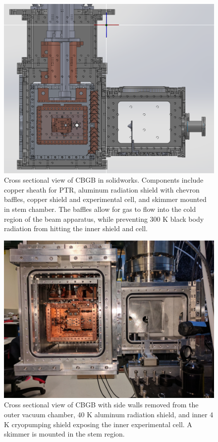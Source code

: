 \begin{figure}[H]
	\centering
	\includegraphics[width=1\textwidth]{images/CBGB_solidworks_cross_section.png}
	\caption{Cross sectional view of CBGB in solidworks. Components include copper sheath for PTR, aluminum radiation shield with chevron baffles, copper shield and experimental cell, and skimmer mounted in stem chamber. The baffles allow for gas to flow into the cold region of the beam apparatus, while preventing 300 K black body radiation from hitting the inner shield and cell.}
	\label{fig: SW chamber}
\end{figure}

\begin{figure}[H]
	\centering
	\includegraphics[width=1\textwidth]{images/CBGB_cross_section.jpg}
	\caption{Cross sectional view of CBGB with side walls removed from the outer vacuum chamber, 40 K aluminum radiation shield, and inner 4 K cryopumping shield exposing the inner experimental cell. A skimmer is mounted in the stem region.}
	\label{fig: chamber}
\end{figure}